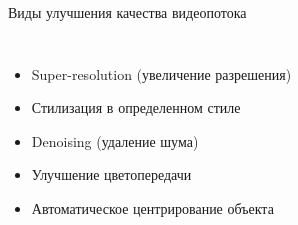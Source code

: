 \documentclass[aspectratio=169,xcolor=dvipsnames]{beamer}
\begin{document}
\begin{frame}{Виды улучшения качества видеопотока}
    \begin{columns}[c] %

        \begin{itemize}
            \item Super-resolution (увеличение разрешения)
            \item Стилизация в определенном стиле
            \item Denoising (удаление шума)
            \item Улучшение цветопередачи
            \item Автоматическое центрирование объекта
        \end{itemize}

        \begin{figure}[h]
            \label{ris:Processed}
        \end{figure}
        
    \end{columns}
\end{frame}

\end{document}
